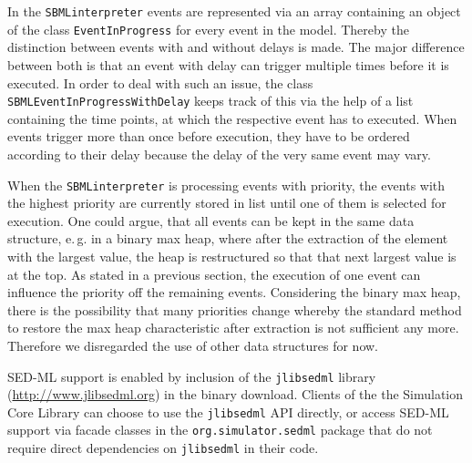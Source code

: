 \documentclass[10pt]{bmc_article}
\newenvironment{bmcformat}{\baselineskip20pt\sloppy\setboolean{publ}{false}}{\baselineskip20pt\sloppy}
\newcommand{\SBMLinterpreter}{\texttt{SBML\-interpreter}}
\newcommand{\jlibsedml}{\texttt{jlibsedml}}
\newcommand{\EventInProgress}{\texttt{Event\-In\-Progress}}
\newcommand{\SBMLEventInProgressWithDelay}{\texttt{SBML\-Event\-In\-Progress\-With\-Delay}}
\begin{document}
\begin{bmcformat}
In the \SBMLinterpreter{} events are represented via an array containing an object of the class \EventInProgress{} for every event in the model. Thereby the distinction between events with and without delays is made. The major difference between both is that an event with delay can trigger multiple times before it is executed. In order to deal with such an issue, the class \SBMLEventInProgressWithDelay{} keeps track of this via the help of a list containing the time points, at which the respective event has to executed. When events trigger more than once before execution, they have to be ordered according to their delay because the delay of the very same event may vary.

When the \SBMLinterpreter{} is processing events with priority, the events with the highest priority 
are currently stored in list until one of them is selected for execution. One could argue, that all events can
be kept in the same data structure, e.\,g. in a binary max heap, where after the extraction of the element with the largest value, the heap is restructured so that that next largest value is at the top. As stated
in a previous section, the execution of one event can influence the priority off the remaining events. Considering the binary max heap, there is the possibility that many priorities change whereby the standard
method to restore the max heap characteristic after extraction is not sufficient any more. Therefore we disregarded the use of other data structures for now.
%

%
SED-ML support is enabled by inclusion of the \jlibsedml{} library
(\href{http://www.jlibsedml.org}{http://www.jlibsedml.org}) in the binary
download. Clients of the the Simulation Core Library can choose to use the
\jlibsedml{} API directly, or access SED-ML support via  facade classes
in the \texttt{org.simulator.sedml} package that do not require direct
dependencies on \jlibsedml{} in their code.



\end{bmcformat}
\end{document}

